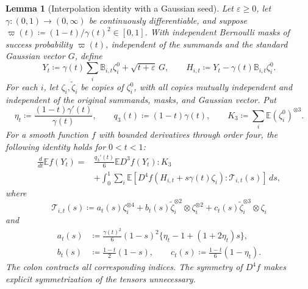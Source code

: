 \documentclass[11pt,letterpaper]{article}
\newtheorem{lemma}{Lemma}
\theoremstyle{remark}
\newcommand{\E}{\mathbb E}
\newcommand{\dd}{\,d}
\begin{document}
\begin{lemma}[Interpolation identity with a Gaussian seed]
\label{appx-an:lem:identity}
Let \(\varepsilon\ge0\), let \(\gamma:(0,1)\to(0,\infty)\) be
continuously differentiable, and suppose
\(\varpi(t)\coloneqq(1-t)/\gamma(t)^2\in[0,1]\). With independent
Bernoulli masks of success probability \(\varpi(t)\), independent
of the summands and the standard Gaussian vector \(G\), define
\begin{equation}
 Y_t\coloneqq\gamma(t)\sum_i\mathbb B_{i,t}\zeta_i^0
                    +\sqrt{t+\varepsilon}\,G,\qquad
 H_{i,t}\coloneqq Y_t-\gamma(t)\mathbb B_{i,t}\zeta_i^0.
 \label{eq:interpolation-family}
\end{equation}
For each \(i\), let \(\zeta_i,\widetilde\zeta_i\) be copies of
\(\zeta_i^0\), with all copies mutually independent and independent
of the original summands, masks, and Gaussian vector. Put
\[
 \eta_t\coloneqq\frac{(1-t)\gamma'(t)}{\gamma(t)},\qquad
 q_3(t)\coloneqq(1-t)\gamma(t),\qquad
 K_3\coloneqq\sum_i\E(\zeta_i^0)^{\otimes3}.
\]
For a smooth function \(f\) with bounded derivatives through order
four, the following identity holds for \(0<t<1\):
\begin{equation}
 \begin{aligned}
 \frac{d}{dt}\E f(Y_t)
 ={}&\frac{q_3'(t)}6\E D^3f(Y_t):K_3\\
 &+\int_0^1\sum_i\E\!\left[
       D^4f(H_{i,t}+s\gamma(t)\zeta_i):\mathcal T_{i,t}(s)
     \right]\dd s,
 \end{aligned}
 \label{appx-an:fourth-identity}
\end{equation}
where
\[
 \mathcal T_{i,t}(s)\coloneqq
 a_t(s)\zeta_i^{\otimes4}
 +b_t(s)\widetilde\zeta_i^{\otimes2}\otimes\zeta_i^{\otimes2}
 +c_t(s)\widetilde\zeta_i^{\otimes3}\otimes\zeta_i
\]
and
\begin{equation}
 \begin{aligned}
 a_t(s)&\coloneqq\frac{\gamma(t)^2}{6}(1-s)^2
                   \{\eta_t-1+(1+2\eta_t)s\},\\
 b_t(s)&\coloneqq\frac{1-t}{2}(1-s),\qquad
 c_t(s)\coloneqq\frac{1-t}{6}(1-\eta_t).
 \end{aligned}
 \label{appx-an:kernel}
\end{equation}
The colon contracts all corresponding indices. The symmetry of
\(D^4f\) makes explicit symmetrization of the tensors unnecessary.
\end{lemma}
\end{document}
